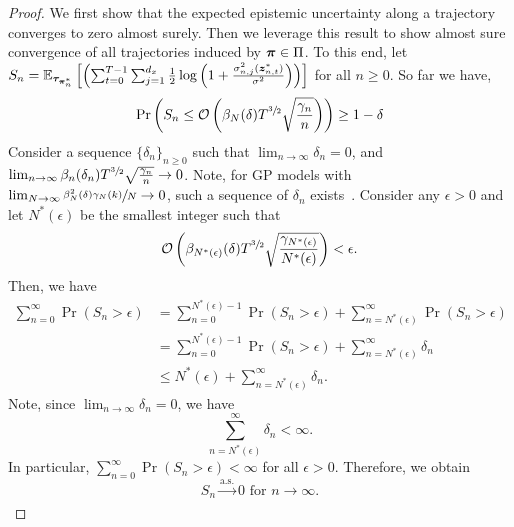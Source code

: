 \begin{proof}
We first show that the expected epistemic uncertainty along a trajectory converges to zero almost surely. Then we leverage this result to show almost sure convergence of all trajectories induced by ${\bm{\pi}} \in \Pi$. To this end, let $S_n = \mathbb{E}_{{\bm{\tau}}_{{\bm{\pi}}^*_n}}\left[\left(\sum_{t=0}^{T-1} \sum^{d_x}_{j=1}\frac{1}{2} \log \left(1 + \frac{\sigma_{n, j}^2({\bm{z}}^*_{n, t})}{\sigma^2}\right)\right)\right]$ for all $n\geq 0$. So far we have,
   \begin{equation*}
       \Pr \left( S_n \leq {\mathcal{O}} \left(\beta_{N}(\delta) T^{\sfrac{3}{2}}\sqrt{\frac{\gamma_n}{n}}\right) \right) \geq 1 - \delta
   \end{equation*}
Consider a sequence $\{\delta_n\}_{n\geq 0}$ such that $\lim_{n \to \infty} \delta_n = 0$, and $\lim_{n \to \infty} \beta_{n}(\delta_n) T^{\sfrac{3}{2}}\sqrt{\frac{\gamma_n}{n}} \to 0$. Note, for GP models with $\lim_{N\to \infty} \sfrac{\beta_N^2(\delta)\gamma_N(k)}{N} \to 0$, such a sequence of $\delta_n$ exists~\citep{chowdhury2017kernelized}.
Consider any $\epsilon > 0$ and
let $N^*(\epsilon)$ be the smallest integer such that 
\begin{equation*}
    {\mathcal{O}} \left(\beta_{N^*(\epsilon)}(\delta) T^{\sfrac{3}{2}}\sqrt{\frac{\gamma_{N^*(\epsilon)}}{N^*(\epsilon)}}\right) < \epsilon.
\end{equation*}
Then, we have
\begin{align*}
    \sum^{\infty}_{n=0}\Pr(S_n > \epsilon) &=
    \sum^{N^*(\epsilon)-1}_{n=0} \Pr(S_n > \epsilon) + \sum^{\infty}_{n=N^*(\epsilon)} \Pr(S_n > \epsilon) \\
    &= \sum^{N^*(\epsilon)-1}_{n=0} \Pr(S_n > \epsilon) + \sum^{\infty}_{n=N^*(\epsilon)} \delta_n \\
    &\leq N^*(\epsilon) + \sum^{\infty}_{n=N^*(\epsilon)} \delta_n.
\end{align*}
Note, since $\lim_{n \to \infty} \delta_n = 0$, we have 
\begin{equation*}
    \sum^{\infty}_{n=N^*(\epsilon)} \delta_n < \infty.
\end{equation*}
In particular, $\sum^{\infty}_{n=0}\Pr(S_n > \epsilon) < \infty$ for all $\epsilon > 0$.
 Therefore, we obtain 
\begin{equation*}
  S_n \xrightarrow[]{\mathrm{a.s.}} 0 \text{ for } n \to \infty. 
\end{equation*}

\end{proof}
